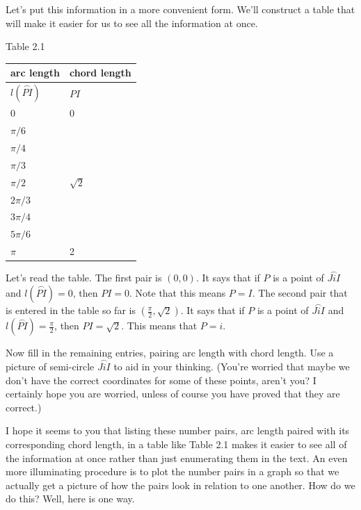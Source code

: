 \documentclass[english]{book}
\newcommand{\arc}[1]{\overset{\frown}{#1} }
\begin{document}
Let's put this information in a more convenient form. We'll construct a table that will make it easier for us to see all the information at once.

\begin{center}
Table 2.1
\end{center}
\begin{table}[htbp]
\begin{center}
\begin{tabular}{|l|l|}
  \hline 
  arc length    &  chord length \\
  \hline 
  $l(\arc{PI})$ & $PI$ \\
  
  \hline
  0             &  0 \\
  $\pi/6$       &    \\
  $\pi/4$       &    \\
  $\pi/3$       &    \\
  $\pi/2$       & $\sqrt{2}$ \\
  $2\pi/3$      &    \\
  $3\pi/4$      &    \\
  $5\pi/6$      &    \\
  $\pi$         &  2 \\
  \hline
\end{tabular}
\label{tbl2.1}
\end{center}
\end{table}

Let's read the table. The first pair is $(0,0)$. It says that if $P$ is a point of $\arc{JiI}$ and $l(\arc{PI}) = 0$, then $PI = 0$. Note that this means $P=I$. The second pair that is entered in the table so far is $(\frac{\pi}{2}, \sqrt{2})$. It says that if $P$ is a point of $\arc{JiI}$ and $l(\arc{PI}) = \frac{\pi}{2}$, then $PI = \sqrt{2}$. This means that $P = i$.

Now fill in the remaining entries, pairing arc length with chord length. Use a picture of semi-circle $\arc{JiI}$ to aid in your thinking. (You're worried that maybe we don't have the correct coordinates for some of these points, aren't you? I certainly hope you are worried, unless of course you have proved that they are correct.) 

I hope it seems to you that listing these number pairs, arc length paired with its corresponding chord length, in a table like Table 2.1 makes it easier to see all of the information at once rather than just enumerating them in the text. An even more illuminating procedure is to plot the number pairs in a graph so that we actually get a picture of how the pairs look in relation to one another. How do we do this? Well, here is one way.
\end{document}
